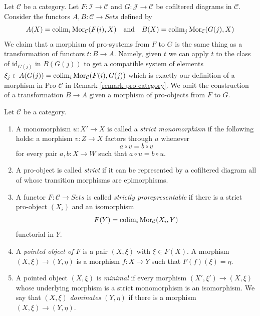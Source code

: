 \begin{remark}
\label{remark-pro-category-copresheaves}
Let $\mathcal{C}$ be a category. Let $F : \mathcal{I} \to \mathcal{C}$ and
$G : \mathcal{J} \to \mathcal{C}$ be cofiltered diagrams in $\mathcal{C}$.
Consider the functors $A, B : \mathcal{C} \to \textit{Sets}$ defined by
$$
A(X) = \mathop{\mathrm{colim}}\nolimits_i \mathop{\mathrm{Mor}}\nolimits_\mathcal{C}(F(i), X)
\quad\text{and}\quad
B(X) = \mathop{\mathrm{colim}}\nolimits_j \mathop{\mathrm{Mor}}\nolimits_\mathcal{C}(G(j), X)
$$
We claim that a morphism of pro-systems from $F$ to $G$ is the same thing
as a transformation of functors $t : B \to A$. Namely, given $t$
we can apply $t$ to the class of $\text{id}_{G(j)}$ in $B(G(j))$
to get a compatible system of elements
$\xi_j \in A(G(j)) = \mathop{\mathrm{colim}}\nolimits_i \mathop{\mathrm{Mor}}\nolimits_\mathcal{C}(F(i), G(j))$
which is exactly our definition of a morphism in $\text{Pro-}\mathcal{C}$ in
Remark \ref{remark-pro-category}. We omit the construction of a
transformation $B \to A$ given a morphism of pro-objects from $F$ to $G$.
\end{remark}

\begin{definition}
\label{definition-strict-prorepresentable-minimal-pair}
Let $\mathcal{C}$ be a category.
\begin{enumerate}
\item A monomorphism $u : X' \to X$ is called a
{\it strict monomorphism} if the following holds: a morphism
$v : Z \to X$ factors through $u$ whenever
$$
a \circ v = b \circ v
$$
for every pair $a, b : X \to W$ such that
$a \circ u = b \circ u$.
\item A pro-object is called {\it strict} if it can be represented by a
cofiltered diagram all of whose transition morphisms are epimorphisms.
\item A functor $F : \mathcal{C} \to \textit{Sets}$ is called
{\it strictly prorepresentable} if there is a strict pro-object
$(X_i)$ and an isomorphism
$$
F(Y) = \mathop{\mathrm{colim}}\nolimits_i \mathop{\mathrm{Mor}}\nolimits_\mathcal{C}(X_i, Y)
$$
functorial in $Y$.
\item A {\it pointed object of $F$} is a pair $(X, \xi)$ with
$\xi \in F(X)$. A morphism $(X, \xi) \to (Y, \eta)$ is a morphism
$f : X \to Y$ such that $F(f)(\xi) = \eta$.
\item A pointed object $(X, \xi)$ is {\it minimal} if every morphism
$(X', \xi') \to (X, \xi)$ whose underlying morphism is a strict
monomorphism is an isomorphism. We say that $(X, \xi)$
{\it dominates} $(Y, \eta)$ if there is a morphism
$(X, \xi) \to (Y, \eta)$.
\end{enumerate}
\end{definition}

